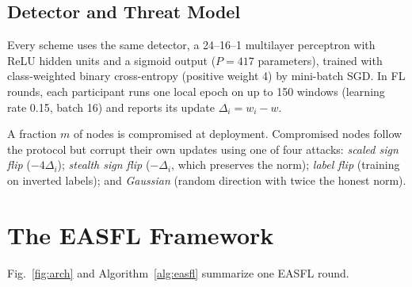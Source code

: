 \documentclass[journal]{IEEEtran}
\begin{document}
\subsection{Detector and Threat Model}
Every scheme uses the same detector, a 24--16--1 multilayer perceptron with ReLU hidden units and a sigmoid output ($P=417$ parameters), trained with class-weighted binary cross-entropy (positive weight 4) by mini-batch SGD. In FL rounds, each participant runs one local epoch on up to 150 windows (learning rate 0.15, batch 16) and reports its update $\Delta_i=w_i-w$.

A fraction $m$ of nodes is compromised at deployment. Compromised nodes follow the protocol but corrupt their own updates using one of four attacks: \emph{scaled sign flip} ($-4\Delta_i$); \emph{stealth sign flip} ($-\Delta_i$, which preserves the norm); \emph{label flip} (training on inverted labels); and \emph{Gaussian} (random direction with twice the honest norm). 

\section{The EASFL Framework}\label{sec:method}
Fig.~\ref{fig:arch} and Algorithm~\ref{alg:easfl} summarize one EASFL round.
\end{document}
